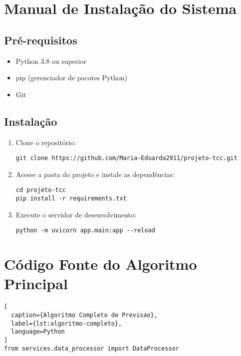 \begin{apendicesenv}

\chapter{Manual de Instalação do Sistema}

\section{Pré-requisitos}
\begin{itemize}
    \item Python 3.8 ou superior
    \item pip (gerenciador de pacotes Python)
    \item Git
\end{itemize}

\section{Instalação}
\begin{enumerate}
    \item Clone o repositório:
    \begin{lstlisting}
git clone https://github.com/Maria-Eduarda2911/projeto-tcc.git
    \end{lstlisting}

    \item Acesse a pasta do projeto e instale as dependências:
    \begin{lstlisting}
cd projeto-tcc
pip install -r requirements.txt
    \end{lstlisting}

    \item Execute o servidor de desenvolvimento:
    \begin{lstlisting}
python -m uvicorn app.main:app --reload
    \end{lstlisting}
\end{enumerate}

\chapter{Código Fonte do Algoritmo Principal}

\begin{lstlisting}[
  caption={Algoritmo Completo de Previsao},
  label={lst:algoritmo-completo},
  language=Python
]
from services.data_processor import DataProcessor


\end{lstlisting}
\end{apendicesenv}
